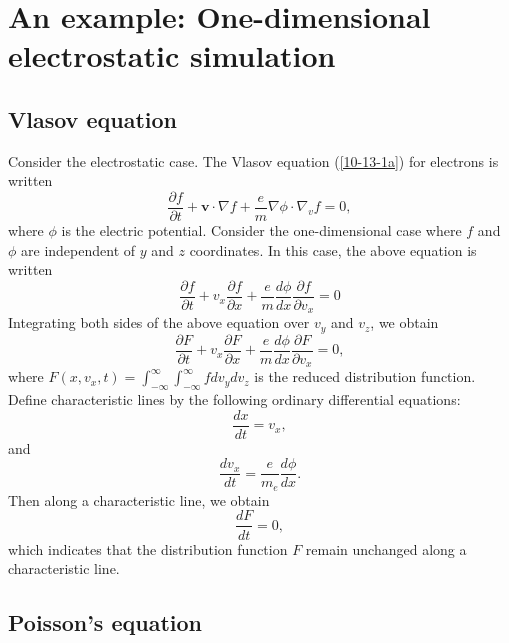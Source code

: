 \documentclass{article}
\begin{document}
\section{An example: One-dimensional electrostatic simulation}

\subsection{Vlasov equation}

Consider the electrostatic case. The Vlasov equation (\ref{10-13-1a}) for
electrons is written
\begin{equation}
  \frac{\partial f}{\partial t} +\mathbf{v} \cdot \nabla f + \frac{e}{m}
  \nabla \phi \cdot \nabla_v f = 0,
\end{equation}
where $\phi$ is the electric potential. Consider the one-dimensional case
where $f$ and $\phi$ are independent of $y$ and $z$ coordinates. In this case,
the above equation is written
\begin{equation}
  \frac{\partial f}{\partial t} + v_x \frac{\partial f}{\partial x} +
  \frac{e}{m}  \frac{d \phi}{d x}  \frac{\partial f}{\partial v_x} = 0
\end{equation}
Integrating both sides of the above equation over $v_y$ and $v_z$, we obtain
\begin{equation}
  \label{10-7-e1} \frac{\partial F}{\partial t} + v_x \frac{\partial
  F}{\partial x} + \frac{e}{m}  \frac{d \phi}{d x}  \frac{\partial F}{\partial
  v_x} = 0,
\end{equation}
where $F (x, v_x, t) = \int_{- \infty}^{\infty} \int_{- \infty}^{\infty} f d
v_y d v_z$ is the reduced distribution function. Define characteristic lines
by the following ordinary differential equations:
\begin{equation}
  \label{10-10-1} \frac{d x}{d t} = v_x,
\end{equation}
and
\begin{equation}
  \label{10-10-2} \frac{d v_x}{d t} = \frac{e}{m_e}  \frac{d \phi}{d x} .
\end{equation}
Then along a characteristic line, we obtain
\begin{equation}
  \label{10-10-3} \frac{d F}{d t} = 0,
\end{equation}
which indicates that the distribution function $F$ remain unchanged along a
characteristic line.

\subsection{Poisson's equation}
\end{document}

